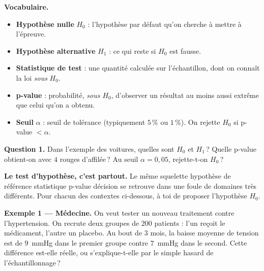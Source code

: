 \begin{mdframed}[backgroundcolor=ThemeLight, linecolor=Theme,
  linewidth=1pt, innertopmargin=8pt, innerbottommargin=8pt, nobreak=true]
\textbf{Vocabulaire.}
\begin{itemize}
  \item \textbf{Hypothèse nulle} $H_0$ : l'hypothèse \og par défaut \fg{} qu'on cherche à mettre à l'épreuve.
  \item \textbf{Hypothèse alternative} $H_1$ : ce qui reste si $H_0$ est fausse.
  \item \textbf{Statistique de test} : une quantité calculée sur l'échantillon, dont on connaît la loi \emph{sous} $H_0$.
  \item \textbf{p-value} : probabilité, \emph{sous $H_0$}, d'observer un résultat au moins aussi extrême que celui qu'on a obtenu.
  \item \textbf{Seuil} $\alpha$ : seuil de tolérance (typiquement $5\,\%$ ou $1\,\%$). On rejette $H_0$ si p-value $<\alpha$.
\end{itemize}
\end{mdframed}

\medskip

\textbf{Question 1.} Dans l'exemple des voitures, quelles sont $H_0$ et $H_1$\,? Quelle p-value obtient-on avec $4$ rouges d'affilée\,? Au seuil $\alpha = 0{,}05$, rejette-t-on $H_0$\,?


\medskip

\textbf{Le test d'hypothèse, c'est partout.} Le même squelette \og hypothèse de référence \textrightarrow{} statistique \textrightarrow{} p-value \textrightarrow{} décision \fg{} se retrouve dans une foule de domaines très différents. Pour chacun des contextes ci-dessous, à toi de proposer l'hypothèse $H_0$.

\smallskip

\textbf{Exemple 1 --- Médecine.} On veut tester un nouveau traitement contre l'hypertension. On recrute deux groupes de $200$ patients : l'un reçoit le médicament, l'autre un placebo. Au bout de $3$ mois, la baisse moyenne de tension est de $9$~mmHg dans le premier groupe contre $7$~mmHg dans le second. Cette différence est-elle réelle, ou s'explique-t-elle par le simple hasard de l'échantillonnage\,?

